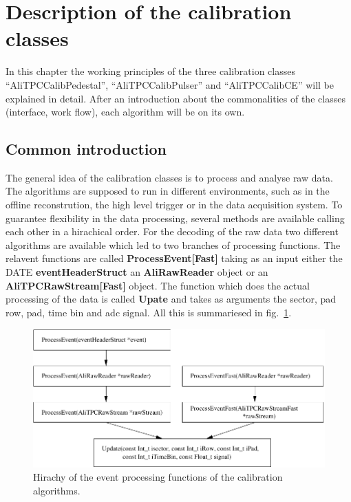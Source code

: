 
\section{Description of the calibration classes}
In this chapter the working principles of the three calibration classes ``AliTPCCalibPedestal'', ``AliTPCCalibPulser'' and ``AliTPCCalibCE'' will be explained in detail. After an introduction about the commonalities of the classes (interface, work flow), each algorithm will be on its own.

\subsection{Common introduction}
The general idea of the calibration classes is to process and analyse raw data. The algorithms are supposed to run in different environments, such as in the offline reconstrution, the high level trigger or in the data acquisition system.
To guarantee flexibility in the data processing, several methods are available calling each other in a hirachical order. For the decoding of the raw data two different algorithms are available which led to two branches of processing functions.
The relavent functions are called {\bf ProcessEvent[Fast]} taking as an input either the DATE  {\bf eventHeaderStruct} an {\bf AliRawReader} object or an {\bf AliTPCRawStream[Fast]} object.
The function which does the actual processing of the data is called {\bf Upate} and takes as arguments the sector, pad row, pad, time bin and adc signal. All this is summariesed in fig.\ \ref{fig:calib.process}.

\begin{figure}
  \centering
  \includegraphics[width=0.9\linewidth]{images/ProcessFunctions}
  \caption{Hirachy of the event processing functions of the calibration algorithms.}
  \label{fig:calib.process}
\end{figure}

